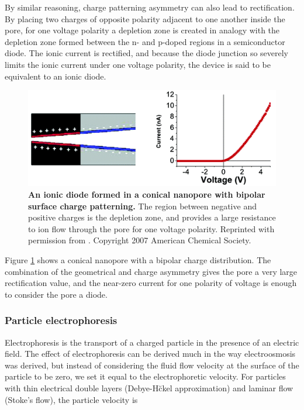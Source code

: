 			By similar reasoning, charge patterning asymmetry can also lead to rectification. By placing two charges of opposite polarity adjacent to one another inside the pore, for one voltage polarity a depletion zone is created in analogy with the depletion zone formed between the n- and p-doped regions in a semiconductor diode. The ionic current is rectified, and because the diode junction so severely limits the ionic current under one voltage polarity, the device is said to be equivalent to an ionic diode.\cite{Vlassiouk2007}
			
			\begin{figure}
				\includegraphics[width=.5\textwidth]{Vlassiouk2007_conicaldiode}
				\caption{\textbf{An ionic diode formed in a conical nanopore with bipolar surface charge patterning.} The region between negative and positive charges is the depletion zone, and provides a large resistance to ion flow through the pore for one voltage polarity. Reprinted with permission from . Copyright 2007 American Chemical Society.}
				\label{fig:Vlassiouk2007conicaldiode}
			\end{figure}
			
			Figure \ref{fig:Vlassiouk2007conicaldiode} shows a conical nanopore with a bipolar charge distribution. The combination of the geometrical and charge asymmetry gives the pore a very large rectification value, and the near-zero current for one polarity of voltage is enough to consider the pore a diode.

			
	
		\subsubsection{Particle electrophoresis}
			
			Electrophoresis is the transport of a charged particle in the presence of an electric field. The effect of electrophoresis can be derived much in the way electroosmosis was derived, but instead of considering the fluid flow velocity at the surface of the particle to be zero, we set it equal to the electrophoretic velocity. For particles with thin electrical double layers (Debye-H\u ckel approximation) and laminar flow (Stoke's flow), the particle velocity is
			
